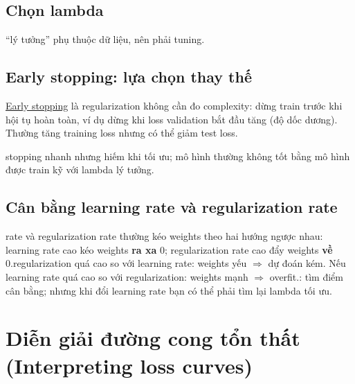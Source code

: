 \documentclass[12pt,a4paper]{article}
\begin{document}
\subsection{Chọn lambda}

\begin{ynghia}\nLambda ``lý tưởng'' phụ thuộc dữ liệu, nên phải tuning.\n\end{ynghia}

\subsection{Early stopping: lựa chọn thay thế}

\begin{dinhnghia}[title={Early stopping}]\n\href{https://developers.google.com/machine-learning/glossary\#early-stopping}{Early stopping} là regularization không cần đo complexity: dừng train trước khi hội tụ hoàn toàn, ví dụ dừng khi loss validation bắt đầu tăng (độ dốc dương). Thường tăng training loss nhưng có thể giảm test loss.\n\end{dinhnghia}

\begin{luuy}\nEarly stopping nhanh nhưng hiếm khi tối ưu; mô hình thường không tốt bằng mô hình được train kỹ với lambda lý tưởng.\n\end{luuy}

\subsection{Cân bằng learning rate và regularization rate}

\begin{ynghia}\nLearning rate và regularization rate thường kéo weights theo hai hướng ngược nhau: learning rate cao kéo weights \textbf{ra xa} 0; regularization rate cao đẩy weights \textbf{về} 0.\n{} regularization quá cao so với learning rate: weights yếu \(\Rightarrow\) dự đoán kém. Nếu learning rate quá cao so với regularization: weights mạnh \(\Rightarrow\) overfit.\n\ntarget: tìm điểm cân bằng; nhưng khi đổi learning rate bạn có thể phải tìm lại lambda tối ưu.\n\end{ynghia}

\section{Diễn giải đường cong tổn thất (Interpreting loss curves)}
\end{document}
